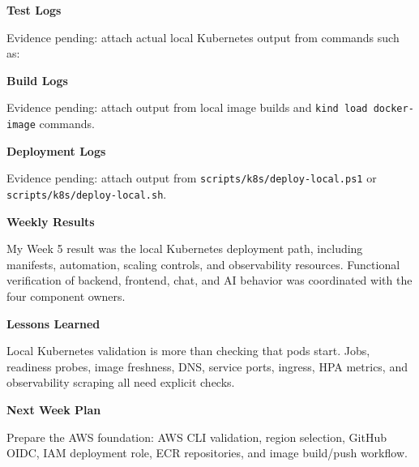 \vspace{0.5em}\noindent\textbf{Test Logs}\par

Evidence pending: attach actual local Kubernetes output from commands
such as:

\begin{Shaded}
\begin{Highlighting}[]
\end{Highlighting}
\end{Shaded}

\vspace{0.5em}\noindent\textbf{Build Logs}\par

Evidence pending: attach output from local image builds and
\texttt{kind\ load\ docker-\allowbreak{}image} commands.

\vspace{0.5em}\noindent\textbf{Deployment Logs}\par

Evidence pending: attach output from
\texttt{scripts/\allowbreak{}k8s/\allowbreak{}deploy-\allowbreak{}local.\allowbreak{}ps1} or
\texttt{scripts/\allowbreak{}k8s/\allowbreak{}deploy-\allowbreak{}local.\allowbreak{}sh}.

\vspace{0.5em}\noindent\textbf{Weekly Results}\par

My Week 5 result was the local Kubernetes deployment path, including
manifests, automation, scaling controls, and observability resources.
Functional verification of backend, frontend, chat, and AI behavior was
coordinated with the four component owners.

\vspace{0.5em}\noindent\textbf{Lessons Learned}\par

Local Kubernetes validation is more than checking that pods start. Jobs,
readiness probes, image freshness, DNS, service ports, ingress, HPA
metrics, and observability scraping all need explicit checks.

\vspace{0.5em}\noindent\textbf{Next Week Plan}\par

Prepare the AWS foundation: AWS CLI validation, region selection, GitHub
OIDC, IAM deployment role, ECR repositories, and image build/push
workflow.
